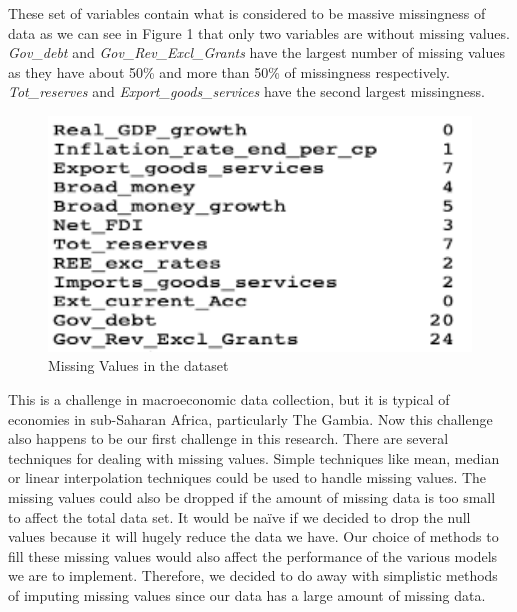 \documentclass[12pt,italian, twoside]{report}
\begin{document}
These set of variables contain what is considered to be massive missingness of data as we can see in Figure 1 that only two variables are without missing values. \textit{Gov\_debt} and \textit{Gov\_Rev\_Excl\_Grants} have the largest number of missing values as they have about 50\% and more than 50\% of missingness respectively. \textit{Tot\_reserves} and \textit{Export\_goods\_services} have the second largest missingness.
\begin{figure}[t]
	\centering
	\includegraphics[width = 150mm]{immagini/missn.png}
	\caption{Missing Values in the dataset}
	\label{fig:missn}
\end{figure}
This is a challenge in macroeconomic data collection, but it is typical of economies in sub-Saharan Africa, particularly The Gambia. Now this challenge also happens to be our first challenge in this research. There are several techniques for dealing with missing values. Simple techniques like mean, median or linear interpolation techniques could be used to handle missing values. The missing values could also be dropped if the amount of missing data is too small to affect the total data set. It would be naïve if we decided to drop the null values because it will hugely reduce the data we have. Our choice of methods to fill these missing values would also affect the performance of the various models we are to implement. Therefore, we decided to do away with simplistic methods of imputing missing values since our data has a large amount of missing data.
\end{document}

